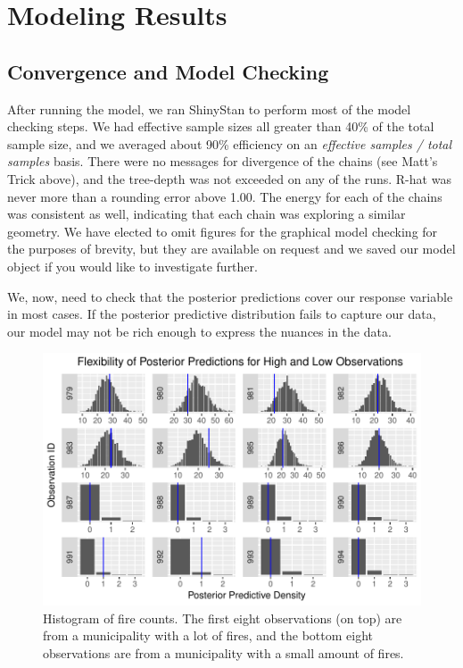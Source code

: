 \documentclass[10pt,a4paper, hidelinks]{article} %
\begin{document}
\section{Modeling Results}
\subsection{Convergence and Model Checking}

After running the model, we ran ShinyStan to perform most of the model checking steps. We had effective sample sizes all greater than 40\% of the total sample size, and we averaged about 90\% efficiency on an \textit{effective samples / total samples} basis. There were no messages for divergence of the chains (see Matt's Trick above), and the tree-depth was not exceeded on any of the runs. R-hat was never more than a rounding error above 1.00. The energy for each of the chains was consistent as well, indicating that each chain was exploring a similar geometry. We have elected to omit figures for the graphical model checking for the purposes of brevity, but they are available on request and we saved our model object if you would like to investigate further. 

We, now, need to check that the posterior predictions cover our response variable in most cases. If the posterior predictive distribution fails to capture our data, our model may not be rich enough to express the nuances in the data. 

\begin{figure}[H]
	\centering
	\begin{minipage}[c]{0.6\textwidth}
	\includegraphics[width=\textwidth]{../fig/post_pred_samples}
	\end{minipage} \hfill
	\begin{minipage}[c]{0.39\textwidth}
	\caption{Histogram of fire counts. The first eight observations (on top) are from a municipality with a lot of fires, and the bottom eight observations are from a municipality with a small amount of fires. }
	\label{fig:postpredsamples}
	\end{minipage}
\end{figure}
\end{document}
